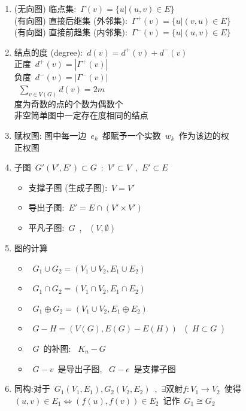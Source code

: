 \documentclass[11pt,a4paper]{article}%
\renewcommand{\[}{~$}
\renewcommand{\]}{$~}%
\begin{document}
\begin{enumerate}
\begin{itemize}
	 	\end{itemize}
	 \item (无向图) 临点集:\[\Gamma(v) = \{u|(u,v)\in E\}\] \\
	 	(有向图) 直接后继集 (外邻集):\[\Gamma^+(v) = \{u|(v,u)\in E\}\] \\
	 	(有向图) 直接前趋集 (内邻集):\[\Gamma^-(v) = \{u|(u,v)\in E\}\]
	 \item 结点的度 (degree):\[d(v) = d^+(v) + d^-(v)\]\\
	 	正度\[d^+(v) = |\Gamma^+(v)|\]\\
	 	负度\[d^-(v) = |\Gamma^-(v)|\]\\
	 	\[\sum_{v\in V(G)}d(v) = 2m\]\\
	 	度为奇数的点的个数为偶数个\\
	 	非空简单图中一定存在度相同的结点
	 \item 赋权图: 图中每一边\[e_k\]都赋予一个实数\[w_k\]作为该边的权\\
	 	正权图
	 \item 子图\[G'(V',E')\subset G\]:\[V'\subset V\],\[E'\subset E\]
	 	\begin{itemize}
	 	 \item 支撑子图 (生成子图):\[V=V'\]
	 	 \item 导出子图:\[E' = E\cap (V'\times V')\]
	 	 \item 平凡子图:\[G\], \[(V,\emptyset )\]
	 	\end{itemize}
	 \item 图的计算
	 	\begin{itemize}
	 	 \item \[G_1 \cup G_2 = (V_1\cup V_2, E_1 \cup E_2)\]
	 	 \item \[G_1 \cap G_2 = (V_1\cap V_2, E_1 \cap E_2)\]
	 	 \item \[G_1 \oplus G_2 = (V_1 \cup V_2, E_1 \oplus E_2 )\]
	 	 \item \[G - H = (V(G), E(G) - E(H))\] (\[H\subset G\])
	 	 \item \[G\]的补图: \[K_n - G\]
	 	 \item \[G-v\]是导出子图, \[G-e\]是支撑子图
	 	\end{itemize}
	 \item 同构:对于\[G_1(V_1,E_1),G_2(V_2,E_2)\],\[\exists \mbox{双射}f: V_1 \to V_2 \]使得\[(u,v)\in E_1 \Leftrightarrow (f(u),f(v)) \in E_2\]记作\[G_1 \cong G_2\]
	\end{enumerate}
	
\end{document}
